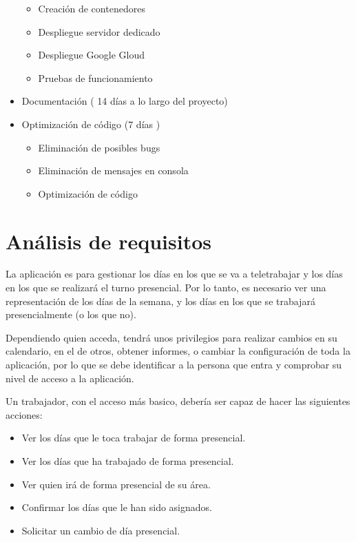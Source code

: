 \documentclass[11pt,spanish,listoffigures,listoftables]{tfgetsinf}
\begin{document}
\begin{itemize}
   \begin{itemize}
      \item Creación de contenedores
      \item Despliegue servidor dedicado
      \item Despliegue Google Gloud
      \item Pruebas de funcionamiento
   \end{itemize}
   \item Documentación ( 14 días a lo largo del proyecto)
   \item Optimización de código (7 días )
   \begin{itemize}
      \item Eliminación de posibles bugs
      \item Eliminación de mensajes en consola
      \item Optimización de código
   \end{itemize}
\end{itemize}

\chapter{Análisis de requisitos}

La aplicación es para gestionar los días en los que se va a teletrabajar y los días en los que se realizará el turno presencial. 
Por lo tanto, es necesario ver una representación de los días de la semana, y los días en los que se trabajará presencialmente (o los que no).

Dependiendo quien acceda, tendrá unos privilegios para realizar cambios en su calendario, en el de otros, obtener informes, o cambiar la configuración de toda la aplicación, por lo que se debe identificar a la persona que entra y comprobar su nivel de acceso a la aplicación.

Un trabajador, con el acceso más basico, debería ser capaz de hacer las siguientes acciones:

\begin{itemize}
   \item Ver los días que le toca trabajar de forma presencial.
   \item Ver los días que ha trabajado de forma presencial.
   \item Ver quien irá de forma presencial de su área.
   \item Confirmar los días que le han sido asignados.
   \item Solicitar un cambio de día presencial.
\end{itemize}
\end{document}
